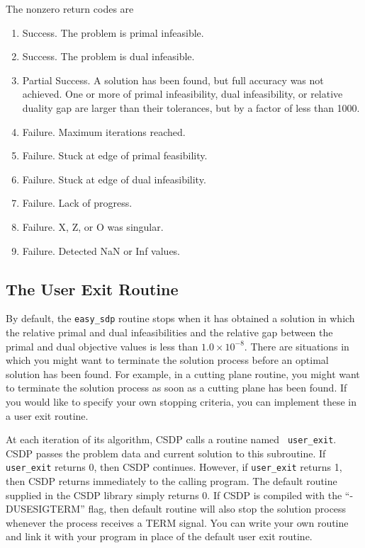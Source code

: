 \documentclass{article}
\begin{document}
The nonzero return codes are
\begin{enumerate}
\item Success.  The problem is primal infeasible. 
\item Success.  The problem is dual infeasible.
\item Partial Success.  A solution has been found, but full accuracy was
not achieved.  One or more of primal infeasibility, dual infeasibility, 
or relative duality gap are larger than their tolerances, but by a factor
of less than 1000.
\item Failure.  Maximum iterations reached.
\item Failure.  Stuck at edge of primal feasibility.
\item Failure.  Stuck at edge of dual infeasibility.
\item Failure.  Lack of progress.
\item Failure.  X, Z, or O was singular.
\item Failure.  Detected NaN or Inf values.  
\end{enumerate}
\subsection*{The User Exit Routine}

By default, the {\tt easy\_sdp} routine stops when it has obtained a
solution in which the relative primal and dual infeasibilities and the
relative gap between the primal and dual objective values is less than
$1.0 \times 10^{-8}$.  There are situations in which you might want to
terminate the solution process before an optimal solution has been
found.  For example, in a cutting plane routine, you might want to
terminate the solution process as soon as a cutting plane has been
found.  If you would like to specify your own stopping criteria, you
can implement these in a user exit routine.

At each iteration of its algorithm, CSDP calls a routine named {\tt
user\_exit}.  CSDP passes the problem data and current solution to
this subroutine.  If {\tt user\_exit} returns 0, then CSDP continues.
However, if {\tt user\_exit} returns 1, then CSDP returns immediately
to the calling program.  The default routine supplied in the CSDP
library simply returns 0.  If CSDP is compiled 
with the ``-DUSESIGTERM'' flag, then default routine will also stop
the solution process whenever the process receives a TERM signal.
You can write your own routine and link it
with your program in place of the default user exit routine.
\end{document}
